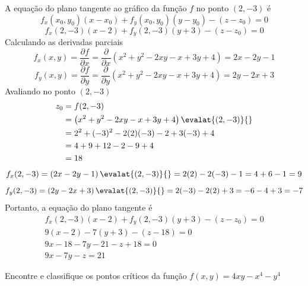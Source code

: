 \documentclass[a4paper,12pt,fleqn]{article}
\newcommand{\D}[2]{\frac{\partial {#1}}{\partial {#2}}}
\begin{document}
\begin{answer}
  A equação do plano tangente ao gráfico da função $f$ no ponto \((2, -3)\) é
  \[
    f_x(x_0, y_0)(x-x_0) + f_y(x_0, y_0)(y-y_0) - (z-z_0) = 0
  \]
  \[
    f_x(2, -3)(x-2) + f_y(2, -3)(y+3) - (z-z_0) = 0
  \]
  Calculando as derivadas parciais
  \[
    f_x(x, y)
    = \D{f}{x}
    = \D{}{x}\left(x^2 + y^2 -2xy -x +3y + 4\right)
    = 2x -2y -1
  \]
  \[
    f_y(x, y)
    = \D{f}{y}
    = \D{}{y}\left(x^2 + y^2 -2xy -x +3y + 4\right)
    = 2y - 2x + 3
  \]
  Avaliando no ponto \((2, -3)\)
  \begin{align*}
    z_0
    & = f(2, -3) \\
    & = \left(x^2 + y^2 -2xy -x +3y + 4\right)\evalat{(2, -3)}{} \\
    & = 2^2 + (-3)^2 -2(2)(-3) -2 +3(-3) + 4 \\
    & = 4 + 9 + 12 - 2 - 9 + 4 \\
    & = 18
  \end{align*}
  \[
    f_x(2, -3)
    = \left(2x -2y -1\right)\evalat{(2, -3)}{}
    = 2(2) - 2(-3) - 1
    = 4 + 6 - 1
    = 9
  \]
  \[
    f_y(2, -3)
    = \left(2y - 2x + 3\right)\evalat{(2, -3)}{}
    = 2(-3) - 2(2) + 3
    = -6 -4 + 3
    = -7
  \]
  Portanto, a equação do plano tangente é
  \begin{gather*}
    f_x(2, -3)(x-2) + f_y(2, -3)(y+3) - (z-z_0) = 0 \\
    9(x-2) -7(y+3) - (z-18) = 0 \\
    9x - 18 -7y -21 -z +18 = 0 \\
    9x -7y -z = 21
  \end{gather*}
  \clearpage
\end{answer}

Encontre e classifique os pontos críticos da função
\(
  f(x, y) = 4xy -x^4 -y^4
\)
\end{document}
